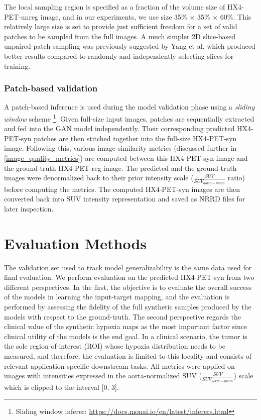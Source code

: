 The local sampling region is specified as a fraction of the volume size of HX4-PET-unreg image, and in our experiments, we use size 35\% $\times$ 35\% $\times$ 60\%. This relatively large size is set to provide just sufficient freedom for a set of valid patches to be sampled from the full images. A much simpler 2D slice-based unpaired patch sampling was previously suggested by Yang et al. \cite{yang2018unpaired} which produced better results compared to randomly and independently selecting slices for training.

\subsubsection{Patch-based validation}
A patch-based inference is used during the model validation phase using a \textit{sliding window} scheme \footnote{Sliding window inferer: \url{https://docs.monai.io/en/latest/inferers.html}}. Given full-size input images, patches are sequentially extracted and fed into the GAN model independently. Their corresponding predicted HX4-PET-syn patches are then stitched together into the full-size HX4-PET-syn image. Following this, various image similarity metrics (discussed further in \ref{image_quality_metrics}) are computed between this HX4-PET-syn image and the ground-truth HX4-PET-reg image. The predicted and the ground-truth images were denormalized back to their prior intensity scale ($\frac{SUV}{SUV_{aorta-mean}}$ ratio) before computing the metrics. The computed HX4-PET-syn images are then converted back into SUV intensity representation and saved as NRRD files for later inspection.



\section{Evaluation Methods}
\label{Evaluation_Methods}
The validation set used to track model generalizability is the same data used for final evaluation. We perform evaluation on the predicted HX4-PET-syn from two different perspectives. In the first, the objective is to evaluate the overall success of the models in learning the input-target mapping, and the evaluation is performed by assessing the fidelity of the full synthetic samples produced by the models with respect to the ground-truth. The second perspective regards the clinical value of the synthetic hypoxia maps as the most important factor since clinical utility of the models is the end goal. In a clinical scenario, the tumor is the sole region-of-interest (ROI) whose hypoxia distribution needs to be measured, and therefore, the evaluation is limited to this locality and consists of relevant application-specific downstream tasks. All metrics were applied on images with intensities expressed in the aorta-normalized SUV ($\frac{SUV}{SUV_{aorta-mean}}$) scale which is clipped to the interval [0, 3]. 


